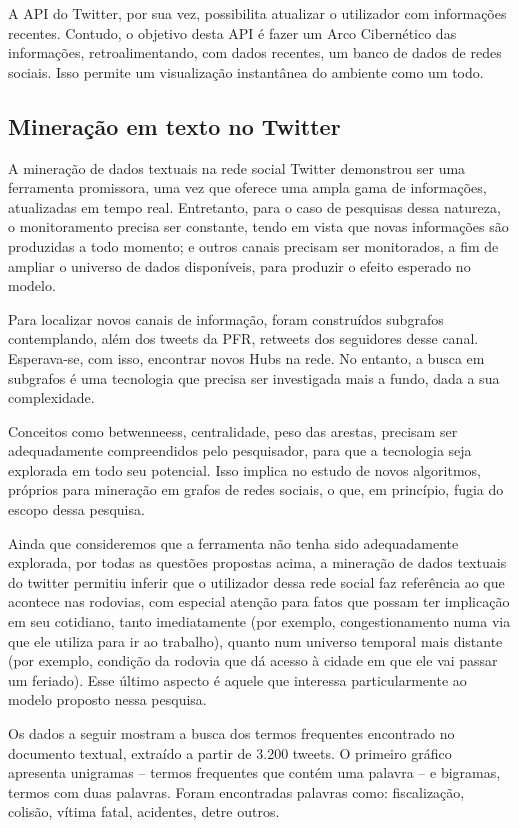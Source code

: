 A API do Twitter, por sua vez, possibilita atualizar o utilizador com informações recentes. Contudo, o objetivo desta API é fazer 
um Arco Cibernético das informações, retroalimentando, com dados recentes, um banco de dados de redes sociais. Isso permite um visualização 
instantânea do ambiente como um todo.


\subsection{Mineração em texto no Twitter}

A mineração de dados textuais na rede social Twitter demonstrou ser uma ferramenta promissora, uma vez que oferece uma ampla gama de informações, atualizadas em tempo real. Entretanto, para o caso de pesquisas dessa natureza, o monitoramento precisa ser constante, tendo em vista que novas informações são produzidas a todo momento; e outros canais precisam ser monitorados, a fim de ampliar o universo de dados disponíveis, para produzir o efeito esperado no modelo.

Para localizar novos canais de informação, foram construídos subgrafos contemplando, além dos tweets da PFR, retweets dos seguidores desse canal. Esperava-se, com isso, encontrar novos Hubs na rede. No entanto, a busca em subgrafos é uma tecnologia que precisa ser investigada mais a fundo, dada a sua complexidade.

Conceitos como betwenneess, centralidade, peso das arestas, precisam ser adequadamente compreendidos pelo pesquisador, para que a tecnologia seja explorada em todo seu potencial. Isso implica no estudo de novos algoritmos, próprios para mineração em grafos de redes sociais, o que, em princípio, fugia do escopo dessa pesquisa.

Ainda que consideremos que a ferramenta não tenha sido adequadamente explorada, por todas as questões propostas acima, a mineração de dados textuais do twitter permitiu inferir que o utilizador dessa rede social faz referência ao que acontece nas rodovias, com especial atenção para fatos que possam ter implicação em seu cotidiano, tanto imediatamente (por exemplo, congestionamento numa via que ele utiliza para ir ao trabalho), quanto num universo temporal mais distante (por exemplo, condição da rodovia que dá acesso à cidade em que ele vai passar um feriado). Esse último aspecto é aquele que interessa particularmente ao modelo proposto nessa pesquisa.

Os dados a seguir mostram a busca dos termos frequentes encontrado no documento textual, extraído a partir de 3.200 tweets. O primeiro gráfico apresenta unigramas -- termos frequentes que contém uma palavra -- e bigramas, termos com duas palavras. Foram encontradas palavras como: fiscalização, colisão, vítima fatal, acidentes, detre outros. 

